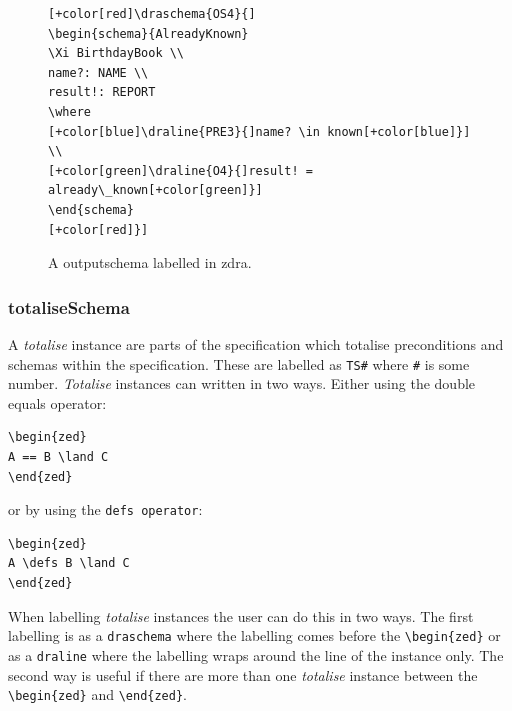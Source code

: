 \begin{figure}[H]
\centering
\begin{footnotesize}
\begin{BVerbatim}[commandchars=+\[\]]
[+color[red]\draschema{OS4}{]
\begin{schema}{AlreadyKnown}
\Xi BirthdayBook \\
name?: NAME \\
result!: REPORT
\where
[+color[blue]\draline{PRE3}{]name? \in known[+color[blue]}] \\
[+color[green]\draline{O4}{]result! = already\_known[+color[green]}]
\end{schema}
[+color[red]}]
\end{BVerbatim}
\end{footnotesize}
\caption{\label{fig:exampleofos} A outputschema labelled in \gls{zdra}.}
\end{figure}

\subsubsection{totaliseSchema}

A \emph{totalise} instance are parts of the specification which totalise
preconditions and schemas within the specification. These are labelled as
\verb|TS#| where \verb|#| is some number. \emph{Totalise} instances can written
in two ways. Either using the double equals operator:

\begin{verbatim}
\begin{zed}
A == B \land C
\end{zed}
\end{verbatim}

or by using the \verb|defs operator|:

\begin{verbatim}
\begin{zed}
A \defs B \land C
\end{zed}
\end{verbatim}

When labelling \emph{totalise} instances the user can do this in two ways. The
first labelling is as a \verb|draschema| where the labelling comes before the
\verb|\begin{zed}| or as a \verb|draline| where the labelling wraps around the
line of the instance only. The second way is useful if there are more than one
\emph{totalise} instance between the \verb|\begin{zed}| and \verb|\end{zed}|. 

